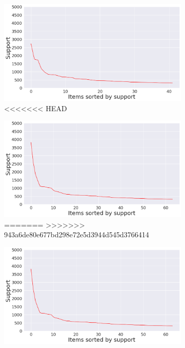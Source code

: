 \documentclass[12pt,%
               a4paper,%
               oneside,openany,%
               titlepage,%
               headinclude,footinclude,%
               BCOR5mm,%
               cleardoublepage=empty,%
               tablecaptionabove,%
               floatperchapter,
               ]{scrreprt}                 %
\begin{document}
\begin{figure}[ht]
\begin{minipage}[b]{0.5\linewidth}
\begin{figure}[ht]
\begin{minipage}[b]{0.5\linewidth}
    \vspace{4ex}
  \end{minipage}
  \begin{minipage}[b]{0.5\linewidth}
    \centering
    \includegraphics[width=.9\linewidth]{Figures/Support_distrubution_delta.png}
    \vspace{4ex}
<<<<<<< HEAD
  \end{minipage} 
    \begin{minipage}[b]{0.5\linewidth}
    \centering
    \includegraphics[width=.9\linewidth]{Figures/Support_distrubution_pfizer.png} 
    \vspace{4ex}
=======
>>>>>>> 943a6de80e677bd298e72e5d3944d545d3766414
  \end{minipage}
  \begin{minipage}[b]{0.5\linewidth}
    \centering
    \includegraphics[width=.9\linewidth]{Figures/Support_distrubution_pfizer.png}

\end{minipage}
\end{figure}
\end{minipage}
\end{figure}
\end{document}
